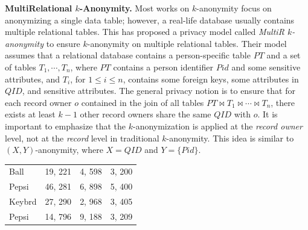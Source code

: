 \textbf{MultiRelational $k$-Anonymity.} Most works on $k$-anonymity focus on anonymizing a single data table; however, a real-life \cite{diamantaras1996pcn} database usually contains multiple relational tables. This has proposed a privacy model called \emph{MultiR $k$-anonymity} to ensure $k$-anonymity on multiple relational tables. Their model assumes that a relational database contains a person-specific table $PT$ and a set of tables $T_1,\cdots,T_n$, where $PT$ contains a person identifier $Pid$ and some sensitive attributes, and $T_i$, for $1 \leq i \leq n$, contains some foreign keys, some attributes in $QID$, and sensitive attributes. The general privacy notion is to ensure that for each record owner $o$ contained in the join of all tables $PT \Join T_1 \Join \cdots \Join T_n$, there exists at least $k-1$ other record owners share the same $QID$ with $o$. It is important to emphasize that the $k$-anonymization is applied at the \emph{record owner} level, not at the \emph{record} level in traditional $k$-anonymity. This idea is similar to $(X,Y)$-anonymity, where $X=QID$ and $Y=\{Pid\}$.

\begin{table}[b!]%
\begin{tabular}{@{}lccc@{}}
Ball &19, 221 &4, 598   &3, 200\\
Pepsi &46, 281 &6, 898 &5, 400\\
Keybrd   &27, 290 &2, 968 &3, 405\\
Pepsi    &14, 796 &9, 188 &3, 209\\
\end{tabular}
\end{table}


